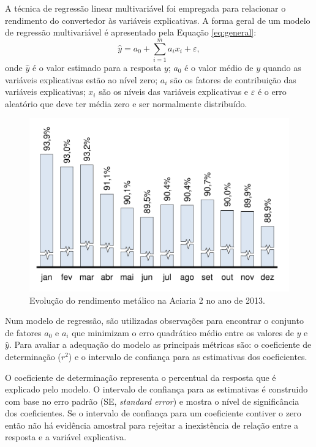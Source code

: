 \begin{multicols}{2}
	A técnica de regressão linear multivariável\cite{wiki:reglin} foi empregada para relacionar o rendimento do convertedor às variáveis explicativas. A forma geral de um modelo de regressão multivariável é apresentado pela Equação \ref{eq:general}:
	\begin{equation}
		\label{eq:general}
		\hat{y} = a_0 + \sum_{i=1}^m a_i x_i + \varepsilon,		
	\end{equation}
	\noindent onde $\hat{y}$ é o valor estimado para a resposta $y$; $a_0$ é o valor médio de $y$ quando as variáveis explicativas estão ao nível zero; $a_i$ são os fatores de contribuição das variáveis explicativas; $x_i$ são os níveis das variáveis explicativas e $\varepsilon$ é o erro aleatório que deve ter média zero e ser normalmente distribuído.
	\begin{figure}[H]
		\centering
		\includegraphics[scale=0.55, bb=0 0 432 288, trim=0in 0in 0in 0in]{figures/fig02-excel.pdf} %
		\caption{Evolução do rendimento metálico na Aciaria 2 no ano de 2013\cite{rel2}.}
		\label{fig:evol_rend}
	\end{figure}		
	Num modelo de regressão, são utilizadas observações para encontrar o conjunto de fatores $a_0$ e $a_i$ que minimizam o erro quadrático médio entre os valores de $y$ e $\hat{y}$. Para avaliar a adequação do modelo as principais métricas são: o coeficiente de determinação ($r^2$) e o intervalo de confiança para as estimativas dos coeficientes. 
	
	O coeficiente de determinação representa o percentual da resposta que é explicado pelo modelo. O intervalo de confiança para as estimativas é construido com base no erro padrão (SE, \textit{standard error}) e mostra o nível de significância dos coeficientes. Se o intervalo de confiança para um coeficiente contiver o zero então não há evidência amostral para rejeitar a inexistência de relação entre a resposta e a variável explicativa.
	

\end{multicols}
